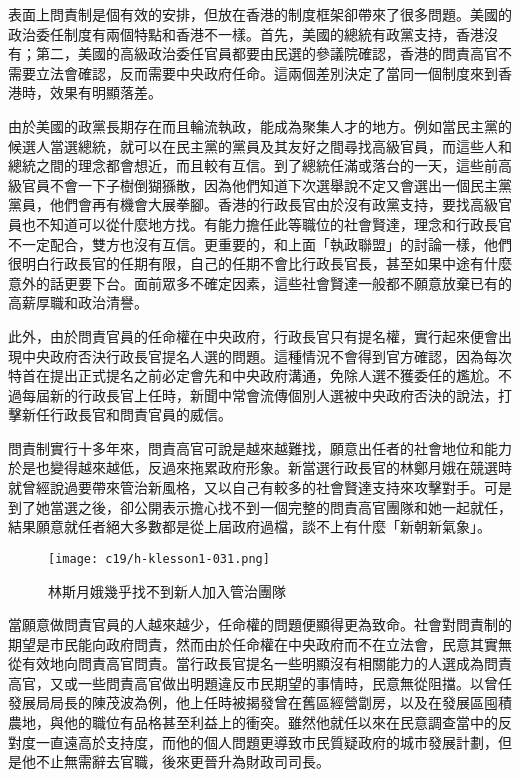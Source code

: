 表面上問責制是個有效的安排，但放在香港的制度框架卻帶來了很多問題。美國的政治委任制度有兩個特點和香港不一樣。首先，美國的總統有政黨支持，香港沒有；第二，美國的高級政治委任官員都要由民選的參議院確認，香港的問責高官不需要立法會確認，反而需要中央政府任命。這兩個差別決定了當同一個制度來到香港時，效果有明顯落差。

由於美國的政黨長期存在而且輪流執政，能成為聚集人才的地方。例如當民主黨的候選人當選總統，就可以在民主黨的黨員及其友好之間尋找高級官員，而這些人和總統之間的理念都會想近，而且較有互信。到了總統任滿或落台的一天，這些前高級官員不會一下子樹倒猢猻散，因為他們知道下次選舉說不定又會選出一個民主黨黨員，他們會再有機會大展拳腳。香港的行政長官由於沒有政黨支持，要找高級官員也不知道可以從什麼地方找。有能力擔任此等職位的社會賢達，理念和行政長官不一定配合，雙方也沒有互信。更重要的，和上面「執政聯盟」的討論一樣，他們很明白行政長官的任期有限，自己的任期不會比行政長官長，甚至如果中途有什麼意外的話更要下台。面前眾多不確定因素，這些社會賢達一般都不願意放棄已有的高薪厚職和政治清譽。

此外，由於問責官員的任命權在中央政府，行政長官只有提名權，實行起來便會出現中央政府否決行政長官提名人選的問題。這種情況不會得到官方確認，因為每次特首在提出正式提名之前必定會先和中央政府溝通，免除人選不獲委任的尷尬。不過每屆新的行政長官上任時，新聞中常會流傳個別人選被中央政府否決的說法，打擊新任行政長官和問責官員的威信。

問責制實行十多年來，問責高官可說是越來越難找，願意出任者的社會地位和能力於是也變得越來越低，反過來拖累政府形象。新當選行政長官的林鄭月娥在競選時就曾經說過要帶來管治新風格，又以自己有較多的社會賢達支持來攻擊對手。可是到了她當選之後，卻公開表示擔心找不到一個完整的問責高官團隊和她一起就任，結果願意就任者絕大多數都是從上屆政府過檔，談不上有什麼「新朝新氣象」。

\begin{figure}[htbp]
    \centering
    \texttt{[image: c19/h-klesson1-031.png]}
    \caption{林斯月娥幾乎找不到新人加入管治團隊} 
\end{figure}

當願意做問責官員的人越來越少，任命權的問題便顯得更為致命。社會對問責制的期望是市民能向政府問責，然而由於任命權在中央政府而不在立法會，民意其實無從有效地向問責高官問責。當行政長官提名一些明顯沒有相關能力的人選成為問責高官，又或一些問責高官做出明題違反市民期望的事情時，民意無從阻擋。以曾任發展局局長的陳茂波為例，他上任時被揭發曾在舊區經營劏房，以及在發展區囤積農地，與他的職位有品格甚至利益上的衝突。雖然他就任以來在民意調查當中的反對度一直遠高於支持度，而他的個人問題更導致市民質疑政府的城市發展計劃，但是他不止無需辭去官職，後來更晉升為財政司司長。

